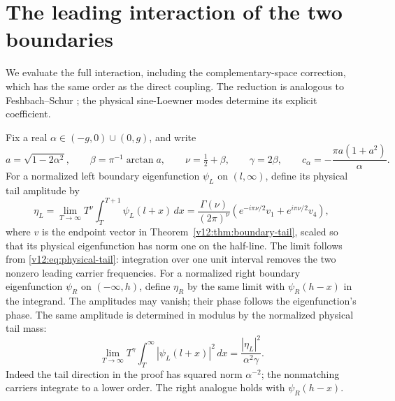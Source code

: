 \section{The leading interaction of the two boundaries}
\label{v13:sec:boundary-interaction}

We evaluate the full interaction, including the complementary-space
correction, which has the same order as the direct coupling. The
reduction is analogous to Feshbach--Schur
\cite[Theorem~1.2 and equations~(1.15)--(1.16)]{DussonSigalStamm2021};
the physical sine-Loewner modes determine its explicit coefficient.

Fix a real $\alpha\in(-g,0)\cup(0,g)$, and write
\begin{equation}\label{v13:eq:interaction-parameters}
 a=\sqrt{1-2\alpha^2},\qquad
 \beta=\pi^{-1}\arctan a,\qquad \nu=\tfrac12+\beta,\qquad
 \gamma=2\beta,\qquad
 c_\alpha=-\frac{\pi a(1+a^2)}{\alpha}.
\end{equation}
For a normalized left boundary eigenfunction $\psi_L$ on $(l,\infty)$,
define its physical tail amplitude by
\begin{equation}\label{v13:eq:physical-amplitude}
 \eta_L=\lim_{T\to\infty}T^\nu
                 \int_T^{T+1}\psi_L(l+x)\,dx
 =\frac{\Gamma(\nu)}{(2\pi)^\nu}
       \left(e^{-i\pi\nu/2}v_1+e^{i\pi\nu/2}v_4\right),
\end{equation}
where $v$ is the endpoint vector in
Theorem~\ref{v12:thm:boundary-tail}, scaled so that its physical
eigenfunction has norm one on the half-line.  The limit follows from
\eqref{v12:eq:physical-tail}: integration over one unit interval
removes the two nonzero leading carrier frequencies.  For a normalized
right boundary eigenfunction $\psi_R$ on $(-\infty,h)$, define
$\eta_R$ by the same limit with $\psi_R(h-x)$ in the integrand.
The amplitudes may vanish; their phase follows the eigenfunction's phase.
The same amplitude is determined in modulus by the normalized physical
tail mass:
\[
 \lim_{T\to\infty}T^\gamma\int_T^\infty
       |\psi_L(l+x)|^2\,dx=\frac{|\eta_L|^2}{\alpha^2\gamma}.
\]
Indeed the tail direction in the proof has squared norm $\alpha^{-2}$;
the nonmatching carriers integrate to a lower order. The right analogue
holds with $\psi_R(h-x)$.

